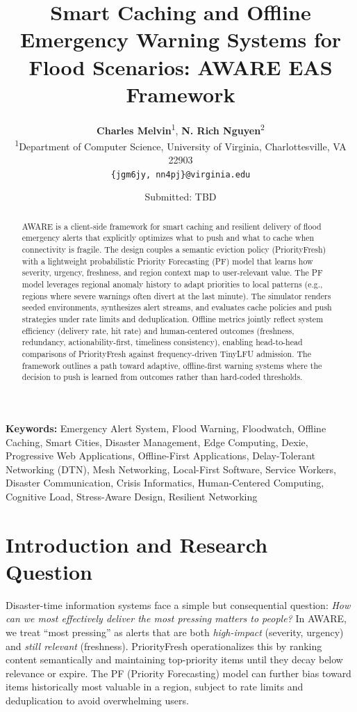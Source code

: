 \documentclass[11pt,twocolumn]{article}
\title{\Large\textbf{Smart Caching and Offline Emergency Warning Systems for Flood Scenarios: AWARE EAS Framework}}
\author{
    \textbf{Charles Melvin}\textsuperscript{1}, \textbf{N. Rich Nguyen}\textsuperscript{2} \\
    \small\textsuperscript{1}Department of Computer Science, University of Virginia, Charlottesville, VA 22903 \\
    \small\texttt{\{jgm6jy, nn4pj\}@virginia.edu}
}
\date{\small Submitted: TBD}
\begin{document}
\maketitle

\begin{abstract}
\noindent AWARE is a client-side framework for smart caching and resilient delivery of flood emergency alerts that explicitly optimizes what to push and what to cache when connectivity is fragile. The design couples a semantic eviction policy (PriorityFresh) with a lightweight probabilistic Priority Forecasting (PF) model that learns how severity, urgency, freshness, and region context map to user-relevant value. The PF model leverages regional anomaly history to adapt priorities to local patterns (e.g., regions where severe warnings often divert at the last minute). The simulator renders seeded environments, synthesizes alert streams, and evaluates cache policies and push strategies under rate limits and deduplication. Offline metrics jointly reflect system efficiency (delivery rate, hit rate) and human-centered outcomes (freshness, redundancy, actionability-first, timeliness consistency), enabling head-to-head comparisons of PriorityFresh against frequency-driven TinyLFU admission. The framework outlines a path toward adaptive, offline-first warning systems where the decision to push is learned from outcomes rather than hard-coded thresholds.
\end{abstract}

\noindent\textbf{Keywords:} 
Emergency Alert System, Flood Warning, Floodwatch, Offline Caching, 
Smart Cities, Disaster Management, Edge Computing, Dexie, 
Progressive Web Applications, Offline-First Applications, 
Delay-Tolerant Networking (DTN), Mesh Networking, 
Local-First Software, Service Workers, 
Disaster Communication, Crisis Informatics, 
Human-Centered Computing, Cognitive Load, 
Stress-Aware Design, Resilient Networking

\vspace{0.3cm}

\section{Introduction and Research Question}
Disaster-time information systems face a simple but consequential question: \emph{How can we most effectively deliver the most pressing matters to people?} In AWARE, we treat “most pressing” as alerts that are both \emph{high-impact} (severity, urgency) and \emph{still relevant} (freshness). PriorityFresh operationalizes this by ranking content semantically and maintaining top-priority items until they decay below relevance or expire. The PF (Priority Forecasting) model can further bias toward items historically most valuable in a region, subject to rate limits and deduplication to avoid overwhelming users.
\end{document}
